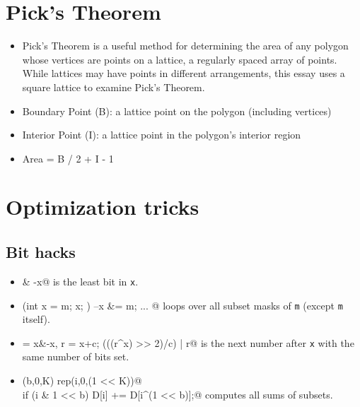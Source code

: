 
\section{Pick's Theorem}
	\begin{itemize}
		\item Pick's Theorem is a useful method for determining the area of any polygon whose vertices are points on a lattice, a regularly spaced array of points. While lattices may have points in different arrangements, this essay uses a square lattice to examine Pick's Theorem.
		\item Boundary Point (B): a lattice point on the polygon (including vertices)
		\item Interior Point (I): a lattice point in the polygon’s interior region
		\item Area = B / 2 + I - 1
	\end{itemize}

\section{Optimization tricks}
	\subsection{Bit hacks}
		\begin{itemize}
			\item \verb@x & -x@ is the least bit in \texttt{x}.
			\item \verb@for (int x = m; x; ) { --x &= m; ... }@ loops over all subset masks of \texttt{m} (except \texttt{m} itself).
			\item \verb@c = x&-x, r = x+c; (((r^x) >> 2)/c) | r@ is the next number after \texttt{x} with the same number of bits set.
			\item \verb@rep(b,0,K) rep(i,0,(1 << K))@ \\ \verb@  if (i & 1 << b) D[i] += D[i^(1 << b)];@ computes all sums of subsets.
		\end{itemize}
